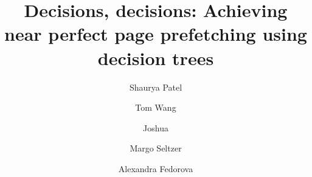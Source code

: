 \documentclass[sigplan, screen,10pt]{acmart}
\begin{document}
\sloppy
\title{Decisions, decisions: Achieving near perfect page prefetching using decision trees}

 \author{Shaurya Patel}

  \author{Tom Wang}

 

  \author{Joshua}

 \author{Margo Seltzer}
 
  \author{Alexandra Fedorova}

\renewcommand{\shortauthors}{Patel, et al.}

\begin{abstract}

\end{abstract}




\end{document}
